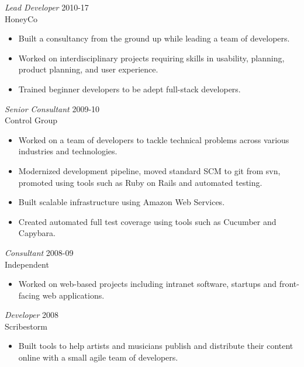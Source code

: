 \documentclass[line,margin]{res}
\begin{document}
\begin{resume}
    {\sl Lead Developer}
    \hfill 2010-17 \\
    HoneyCo
    \begin{itemize} \itemsep -2pt
        \item
            Built a consultancy from the ground up while leading
            a team of developers.

        \item
            Worked on interdisciplinary projects requiring skills in
            usability, planning, product planning, and user experience.

        \item
            Trained beginner developers to be adept full-stack developers.
    \end{itemize}

    {\sl Senior Consultant}
    \hfill 2009-10 \\
    Control Group
    \begin{itemize} \itemsep -2pt
        \item
            Worked on a team of developers to tackle technical problems across
            various industries and technologies.

        \item
            Modernized development pipeline, moved standard SCM to git from
            svn, promoted using tools such as Ruby on Rails and automated
            testing.

        \item
            Built scalable infrastructure using Amazon Web Services.

        \item
            Created automated full test coverage using tools such as Cucumber
            and Capybara.
    \end{itemize}

    \begin{samepage}
    {\sl Consultant}
    \hfill 2008-09 \\
    Independent
    \begin{itemize} \itemsep -2pt
        \item
            Worked on web-based projects including intranet software, startups
            and front-facing web applications.

    \end{itemize}
    \end{samepage}

    \begin{samepage}
    {\sl Developer}
    \hfill 2008 \\
    Scribestorm
    \begin{itemize} \itemsep -2pt
        \item
            Built tools to help artists and musicians publish and distribute
            their content online with a small agile team of developers.


\end{itemize}
\end{samepage}
\end{resume}
\end{document}
